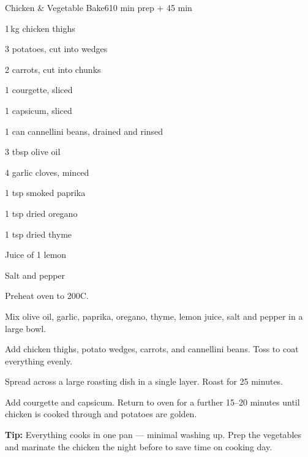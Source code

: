 \begin{recipebox}{Chicken \& Vegetable Bake}{6}{10 min prep + 45 min}
\begin{ingredients}
  \item 1\,kg chicken thighs
  \item 3 potatoes, cut into wedges
  \item 2 carrots, cut into chunks
  \item 1 courgette, sliced
  \item 1 capsicum, sliced
  \item 1 can cannellini beans, drained and rinsed
  \item 3 tbsp olive oil
  \item 4 garlic cloves, minced
  \item 1 tsp smoked paprika
  \item 1 tsp dried oregano
  \item 1 tsp dried thyme
  \item Juice of 1 lemon
  \item Salt and pepper
\end{ingredients}

\begin{method}
  \item Preheat oven to 200\textdegree C.
  \item Mix olive oil, garlic, paprika, oregano, thyme, lemon juice, salt and pepper in a large bowl.
  \item Add chicken thighs, potato wedges, carrots, and cannellini beans. Toss to coat everything evenly.
  \item Spread across a large roasting dish in a single layer. Roast for 25 minutes.
  \item Add courgette and capsicum. Return to oven for a further 15--20 minutes until chicken is cooked through and potatoes are golden.
\end{method}

\begin{notelist}
  \item \textbf{Tip:} Everything cooks in one pan --- minimal washing up. Prep the vegetables and marinate the chicken the night before to save time on cooking day.
\end{notelist}
\end{recipebox}
